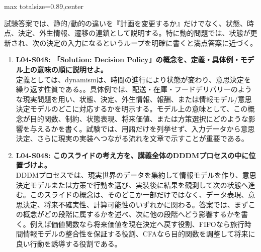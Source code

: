 \begin{minipage}[t]{0.58\textwidth}
\begin{adjustbox}{max totalsize={\textwidth}{0.89\textheight},center}
\begin{minipage}{\textwidth}
試験答案では、静的/動的の違いを『計画を変更するか』だけでなく、状態、時点、決定、外生情報、遷移の連鎖として説明する。特に動的問題では、状態が更新され、次の決定の入力になるというループを明確に書くと満点答案に近づく。\par{}\begin{enumerate}\item \textbf{L04-S048: 「Solution: Decision Policy」の概念を、定義・具体例・モデル上の意味の順に説明せよ。}\\定義としては、dynamismは、時間の進行により状態が変わり、意思決定を繰り返す性質である。。具体例では、配送・在庫・フードデリバリーのような現実問題を用い、状態、決定、外生情報、報酬、または情報モデル/意思決定モデルのどこに対応するかを明示する。モデル上の意味として、この概念が目的関数、制約、状態表現、将来価値、または方策選択にどのような影響を与えるかを書く。試験では、用語だけを列挙せず、入力データから意思決定、さらに現実の実装へつながる流れを文章で示すことが重要である。\item \textbf{L04-S048: このスライドの考え方を、講義全体のDDDMプロセスの中に位置づけよ。}\\DDDMプロセスでは、現実世界のデータを集約して情報モデルを作り、意思決定モデルまたは方策で行動を選び、実装後に結果を観測して次の状態へ進む。このスライドの概念は、そのどこか一部だけではなく、データ表現、意思決定、将来不確実性、計算可能性のいずれかに関わる。答案では、まずこの概念がどの段階に属するかを述べ、次に他の段階へどう影響するかを書く。例えば価値関数なら将来価値を現在決定へ戻す役割、FIFOなら旅行時間情報モデルの整合性を保証する役割、CFAなら目的関数を調整して将来に良い行動を誘導する役割である。\end{enumerate}
\end{minipage}
\end{adjustbox}
\end{minipage}


